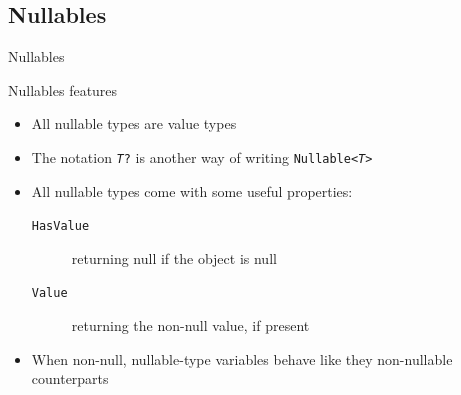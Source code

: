 \documentclass[presentation]{beamer}
\begin{document}
\subsection{Nullables}

\begin{frame}[shrink=5]{\dotnet Nullables}
    \begin{block}{Nullables features}
        \begin{itemize}
            \item All nullable types are \alert{value} types

            \item The notation \texttt{\textit{T}?} is another way of writing \texttt{Nullable<\textit{T}>}
            \item All nullable types come with some useful properties:
            \begin{description}
                \item[\texttt{HasValue}] returning null if the object is null
                \item[\texttt{Value}] returning the non-null value, if present
            \end{description}

            \item When non-null, nullable-type variables behave like they non-nullable counterparts
        \end{itemize}
    \end{block}
    
\end{frame}
\end{document}
